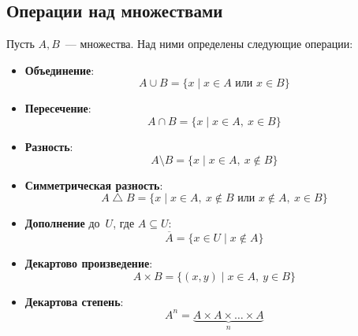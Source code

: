 \subsection{Операции над множествами}
Пусть $A, B$~--- множества. Над ними определены следующие операции:
\begin{itemize}
	\item\textbf{Объединение}:
	\begin{equation*}
	A \cup B = \{ x \mid x \in A \text{ или } x \in B \}
	\end{equation*}
	
	\item\textbf{Пересечение}:
	\begin{equation*}
	A \cap B = \{ x \mid x \in A, \ x \in B \}
	\end{equation*}
	
	\item\textbf{Разность}:
	\begin{equation*}
	A \setminus B = \{ x \mid x \in A, \ x \notin B \}
	\end{equation*}
	
	\item\textbf{Симметрическая разность}:
	\begin{equation*}
	A \bigtriangleup B = \{ x \mid x \in A, \ x \notin B \text{ или } x \notin A, \ x \in B \}
	\end{equation*}
	
	\item\textbf{Дополнение} до~$U$, где $A \subseteq U$:
	\begin{equation*}
	\overline A = \{ x \in U \mid x \notin A \}
	\end{equation*}
	
	\item\textbf{Декартово произведение}:
	\begin{equation*}
	A \times B = \{ (x, y) \mid x \in A, \ y \in B \}
	\end{equation*}
	
	\item\textbf{Декартова степень}:
	\begin{equation*}
	A^n = \underbrace{A \times A \times \ldots \times A}_n
	\end{equation*}
\end{itemize}